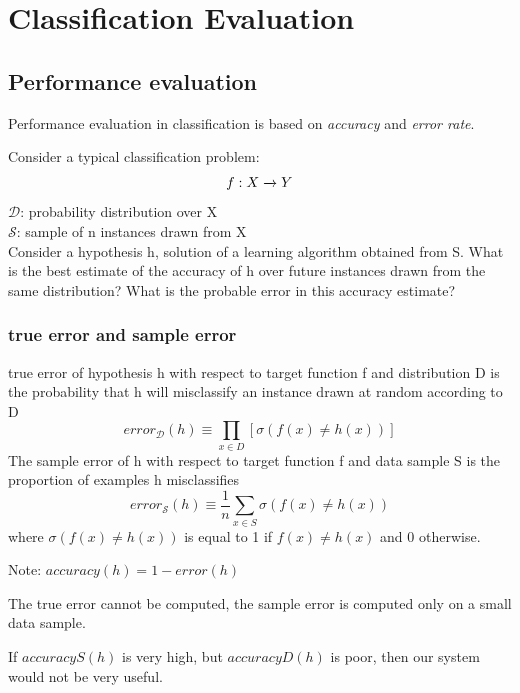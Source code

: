 \section{Classification Evaluation}\label{ClassificationEvaluation} %

\subsection{Performance evaluation}

Performance evaluation in classification is based on \emph{accuracy} and \emph{error rate}.

Consider a typical classification problem:
\begin{equation}
    f: X \xrightarrow{} Y \\
\end{equation}
$\mathcal{D}$: probability distribution over X \\
$\mathcal{S}$: sample of n instances drawn from X \\
Consider a hypothesis h, solution of a learning algorithm obtained from S. What is the best estimate of the accuracy of h over future instances drawn from the same distribution? What is the probable error in this accuracy estimate?

\subsubsection{true error and sample error}
    true error of hypothesis h with respect to target function f and distribution D is the probability that h will misclassify an instance drawn at random according to D
\begin{equation}
    error_{\mathcal{D}}(h) \equiv \prod_{x \in D} [\sigma (f(x) \neq h(x))]
\end{equation}
The sample error of h with respect to target function f and data sample
S is the proportion of examples h misclassifies
\begin{equation}
    error_{\mathcal{S}}(h) \equiv \frac{1}{n}\sum_{x \in S} \sigma (f(x) \neq h(x))
\end{equation}
where $\sigma (f(x) \neq h(x))$ is equal to 1 if $f(x) \neq h(x)$ and 0 otherwise.

Note: $accuracy(h) = 1 - error(h)$

The true error cannot be computed, the sample error is computed only
on a small data sample.

If $accuracyS (h)$ is very high, but $accuracyD(h)$ is poor, then our system
would not be very useful.

